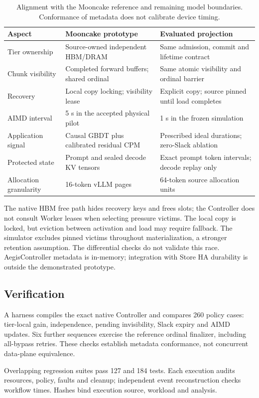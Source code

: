 \begin{table}[t]
\centering
\caption{Alignment with the Mooncake reference and remaining model boundaries.
Conformance of metadata does not calibrate device timing.}
\label{tab:alignment}
\begin{tabular}{@{}p{}p{}p{}@{}}
\toprule
Aspect & Mooncake prototype & Evaluated projection \\
\midrule
Tier ownership & Source-owned independent HBM/DRAM & Same admission, commit and lifetime contract \\
Chunk visibility & Completed forward buffers; shared ordinal & Same atomic visibility and ordinal barrier \\
Recovery & Local copy locking; visibility lease & Explicit copy; source pinned until load completes \\
AIMD interval & 5 s in the accepted physical pilot & 1 s in the frozen simulation \\
Application signal & Causal GBDT plus calibrated residual CPM & Prescribed ideal durations; zero-Slack ablation \\
Protected state & Prompt and sealed decode KV tensors & Exact prompt token intervals; decode replay only \\
Allocation granularity & 16-token vLLM pages & 64-token source allocation units \\
\bottomrule
\end{tabular}
\end{table}

The native HBM free path hides recovery keys and frees slots; the Controller
does not consult Worker leases when selecting pressure victims. The local
copy is locked, but eviction between activation and load may require fallback.
The simulator excludes pinned victims throughout materialization, a stronger
retention assumption. The differential checks do not validate this race.
AegisController metadata is in-memory; integration with Store HA durability
is outside the demonstrated prototype.

\subsection{Verification}
A harness compiles the exact native Controller and compares 260 policy
cases: tier-local gain, independence, pending invisibility, Slack expiry
and AIMD updates. Six further sequences exercise the reference ordinal
finalizer, including all-bypass retries. These checks establish metadata
conformance, not concurrent data-plane equivalence.

Overlapping regression suites pass 127 and 184 tests. Each execution audits
resources, policy, faults and cleanup; independent event reconstruction checks
workflow times. Hashes bind execution source, workload and analysis.
